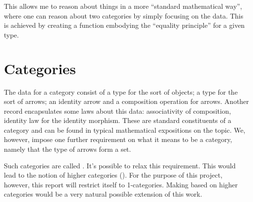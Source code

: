 This allows me to reason about things in a more ``standard mathematical way'',
where one can reason about two categories by simply focusing on the data. This
is achieved by creating a function embodying the ``equality principle'' for a
given type.

\section{Categories}
The data for a category consist of a type for the sort of objects; a type for
the sort of arrows; an identity arrow and a composition operation for arrows.
Another record encapsulates some laws about this data: associativity of
composition, identity law for the identity morphism. These are standard
constituents of a category and can be found in typical mathematical expositions
on the topic. We, however, impose one further requirement on what it means to be
a category, namely that the type of arrows form a set.

Such categories are called . It's possible to relax this
requirement. This would lead to the notion of higher categories (\cite[p.
  307]{hott-2013}). For the purpose of this project, however, this report will
restrict itself to 1-categories. Making based on higher categories would be a
very natural possible extension of this work.

